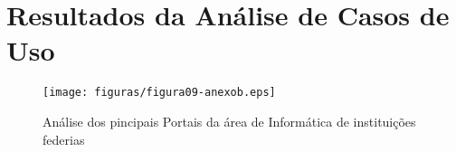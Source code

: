 
\chapter{Resultados da Análise de Casos de Uso}
\begin{figure}[hbtn]
   \centering
   \texttt{[image: figuras/figura09-anexob.eps]}
   \caption{Análise dos pincipais Portais da área de Informática de instituições federias}
   \label{fig:CASOSDEUSO}
\end{figure}
